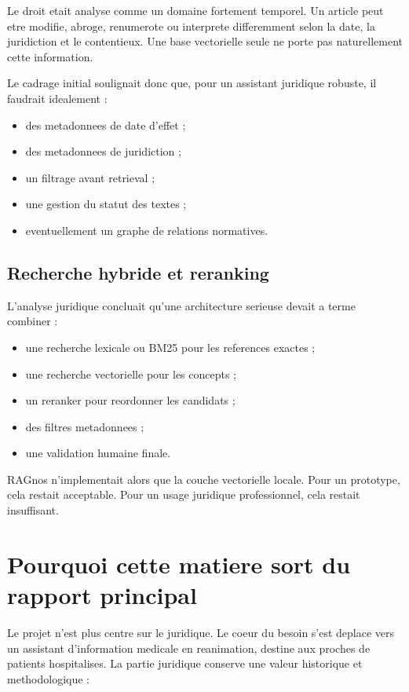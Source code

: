 \documentclass[11pt,a4paper]{article}
\begin{document}
Le droit etait analyse comme un domaine fortement temporel. Un article peut etre modifie, abroge, renumerote ou interprete differemment selon la date, la juridiction et le contentieux. Une base vectorielle seule ne porte pas naturellement cette information.

Le cadrage initial soulignait donc que, pour un assistant juridique robuste, il faudrait idealement :

\begin{itemize}
  \item des metadonnees de date d'effet ;
  \item des metadonnees de juridiction ;
  \item un filtrage avant retrieval ;
  \item une gestion du statut des textes ;
  \item eventuellement un graphe de relations normatives.
\end{itemize}

\subsection{Recherche hybride et reranking}

L'analyse juridique concluait qu'une architecture serieuse devait a terme combiner :

\begin{itemize}
  \item une recherche lexicale ou BM25 pour les references exactes ;
  \item une recherche vectorielle pour les concepts ;
  \item un reranker pour reordonner les candidats ;
  \item des filtres metadonnees ;
  \item une validation humaine finale.
\end{itemize}

RAGnos n'implementait alors que la couche vectorielle locale. Pour un prototype, cela restait acceptable. Pour un usage juridique professionnel, cela restait insuffisant.

\section{Pourquoi cette matiere sort du rapport principal}

Le projet n'est plus centre sur le juridique. Le coeur du besoin s'est deplace vers un assistant d'information medicale en reanimation, destine aux proches de patients hospitalises. La partie juridique conserve une valeur historique et methodologique :
\end{document}
